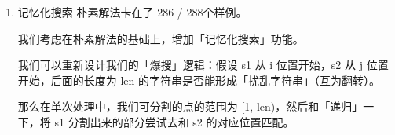 \documentclass[9pt, b5paaper]{book}
\begin{document}
\begin{enumerate}
理解这套做法十分重要，后续的解法都是基于此解法演变过来。
\begin{verbatim}
private boolean idCheck(String ss, String tt) {
    int [] one = new int [26];
    int [] two = new int [26];
    char [] s = ss.toCharArray();
    char [] t = tt.toCharArray();
    for (int i = 0; i < s.length; i++) 
        one[s[i] - 'a']++;
    for (int i = 0; i < t.length; i++) 
        two[t[i]-'a']++;
    for (int i = 0; i < 26; i++) 
        if (one[i] != two[i])
            return false;
    return true;
}
public boolean isScramble(String s, String t) { // tle tle tle
    int n = s.length();
    if (n == 1) return s.charAt(0) == t.charAt(0);
    if (s.equals(t)) return true;
    if (!idCheck(s, t)) return false;
    for (int i = 1; i < n; i++) {
        System.out.println("\n i: " + i);
        String ls = s.substring(0, i), rs = s.substring(i);
        String ltone = t.substring(0, i), rtone = t.substring(i);
        String lttwo = t.substring(0, n-i), rttwo = t.substring(n-i);
        if (isScramble(ls, ltone) && isScramble(rs, rtone)
            || isScramble(ls, rttwo) && isScramble(rs, lttwo))
            return true;
    }
    return false;
}
\end{verbatim}

时间复杂度：O(5\^{}n)

空间复杂度：忽略递归与生成子串带来的空间开销，复杂度为 O(1)

\item 记忆化搜索
\label{sec-1-0-2-2}
朴素解法卡在了 286 / 288个样例。

我们考虑在朴素解法的基础上，增加「记忆化搜索」功能。

我们可以重新设计我们的「爆搜」逻辑：假设 s1 从 i 位置开始，s2 从 j 位置开始，后面的长度为 len 的字符串是否能形成「扰乱字符串」（互为翻转）。

那么在单次处理中，我们可分割的点的范围为 [1, len)，然后和「递归」一下，将 s1 分割出来的部分尝试去和 s2 的对应位置匹配。


\end{enumerate}
\end{document}

